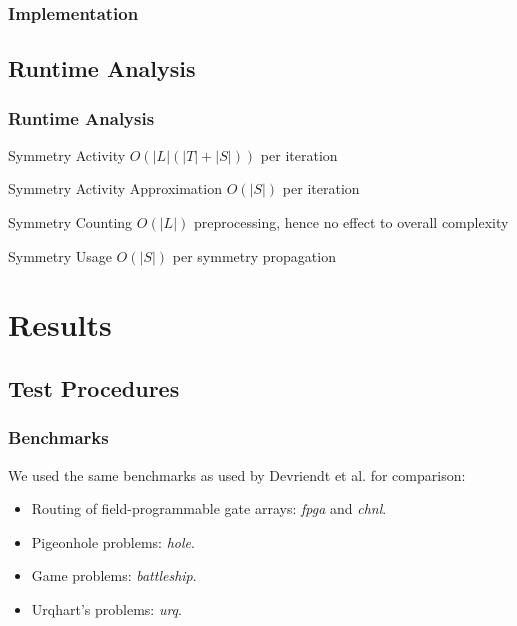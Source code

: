 \documentclass{beamer}
\begin{document}
	\begin{frame}
		\frametitle{Implementation}

	\end{frame}


	\subsection{Runtime Analysis}
	\begin{frame}
		\frametitle{Runtime Analysis}
		
		\begin{block}{Symmetry Activity}
			$O(|L|(|T| + |S|))$ per iteration
		\end{block}
		\begin{block}{Symmetry Activity Approximation}
			$O(|S|)$ per iteration
		\end{block}
		\begin{block}{Symmetry Counting}
			$O(|L|)$ preprocessing, hence no effect to overall complexity
		\end{block}
		\begin{block}{Symmetry Usage}
			$O(|S|)$ per symmetry propagation
		\end{block}
	\end{frame}

\section{Results}

	\subsection{Test Procedures}
	\begin{frame}
		\frametitle{Benchmarks}
		We used the same benchmarks as used by Devriendt et al. for comparison:
		\begin{itemize}
			\item Routing of field-programmable gate arrays: \emph{fpga} and \emph{chnl}.
			\item Pigeonhole problems: \emph{hole}.
			\item Game problems: \emph{battleship}.
			\item Urqhart's problems: \emph{urq}.
		\end{itemize}
	\end{frame}
	
\end{document}

